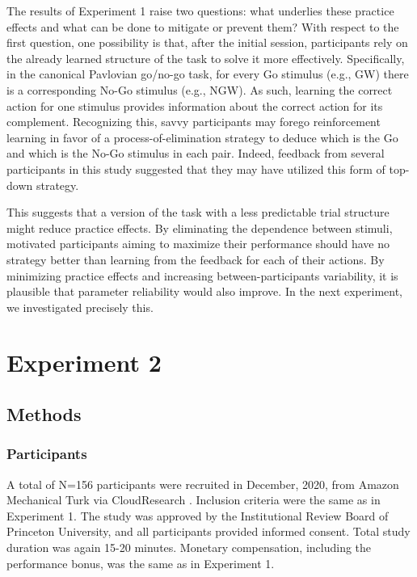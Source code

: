 \documentclass[a4paper,12pt]{article}
\begin{document}
\begin{refsection}[main]
The results of Experiment 1 raise two questions: what underlies these practice effects and what can be done to mitigate or prevent them? With respect to the first question, one possibility is that, after the initial session, participants rely on the already learned structure of the task to solve it more effectively. Specifically, in the canonical Pavlovian go/no-go task, for every Go stimulus (e.g., GW) there is a corresponding No-Go stimulus (e.g., NGW). As such, learning the correct action for one stimulus provides information about the correct action for its complement. Recognizing this, savvy participants may forego reinforcement learning in favor of a process-of-elimination strategy to deduce which is the Go and which is the No-Go stimulus in each pair. Indeed, feedback from several participants in this study suggested that they may have utilized this form of top-down strategy.  

This suggests that a version of the task with a less predictable trial structure might reduce practice effects. By eliminating the dependence between stimuli, motivated participants aiming to maximize their performance should have no strategy better than learning from the feedback for each of their actions. By minimizing practice effects and increasing between-participants variability, it is plausible that parameter reliability would also improve. In the next experiment, we investigated precisely this.

\section*{Experiment 2}

\subsection*{Methods}

\subsubsection*{Participants}

A total of N=156 participants were recruited in December, 2020, from Amazon Mechanical Turk via CloudResearch \cite{litman2017turkprime}. Inclusion criteria were the same as in Experiment 1. The study was approved by the Institutional Review Board of Princeton University, and all participants provided informed consent. Total study duration was again 15-20 minutes. Monetary compensation, including the performance bonus, was the same as in Experiment 1. 


\end{refsection}
\end{document}
